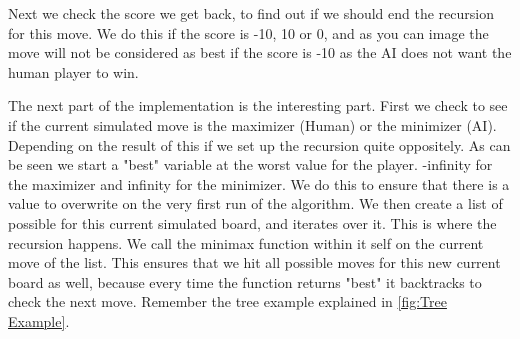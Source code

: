 Next we check the score we get back, to find out if we should end the recursion for this move. We do this if the score is -10, 10 or 0, 
and as you can image the move will not be considered as best 
if the score is -10 as the AI does not want the human player to win.

The next part of the implementation is the interesting part. First we check to see if the current simulated move is the maximizer (Human) or the minimizer (AI). 
Depending on the result of this if we set up the recursion quite oppositely. As can be seen we start a "best" variable at the worst value for the player.
-infinity for the maximizer and infinity for the minimizer. We do this to ensure that there is a value to overwrite on the very first run of the algorithm.
We then create a list of possible for this current simulated board, and iterates over it. This is where the recursion happens.
We call the minimax function within it self on the current move of the list. This ensures that we hit all possible moves for this new current board as well, 
because every time the function returns "best" it backtracks to check the next move. Remember the tree example explained in \ref{fig:Tree Example}.
\clearpage